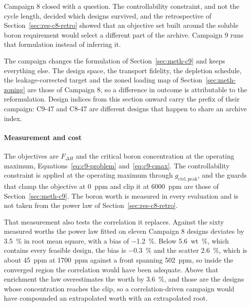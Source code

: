 Campaign 8 closed with a question. The controllability constraint, and
not the cycle length, decided which designs survived, and the
retrospective of Section~\ref{sec:res-c8-retro} showed that an objective
set built around the soluble boron requirement would select a different
part of the archive. Campaign 9 runs that formulation instead of
inferring it.

The campaign changes the formulation of Section~\ref{sec:meth-c9} and
keeps everything else. The design space, the transport fidelity, the
depletion schedule, the leakage-corrected target and the zoned loading map
of Section~\ref{sec:meth-zoning} are those of Campaign 8, so a difference
in outcome is attributable to the reformulation. Design indices from this
section onward carry the prefix of their campaign: C9-47 and C8-47 are
different designs that happen to share an archive index.

\paragraph{Measurement and cost}
\label{sec:res-c9-formulation}

The objectives are $F_{\Delta H}$ and the critical boron concentration at
the operating maximum, Equations~\eqref{eq:c9-problem}
and~\eqref{eq:c9-cmax}. The controllability constraint is applied at the operating
maximum through $g_\mathrm{ctrl,peak}$, and the guards that clamp
the objective at \SI{0}{ppm} and clip it at \SI{6000}{ppm} are those of
Section~\ref{sec:meth-c9}. The boron worth is measured in every evaluation
and is not taken from the power law of
Section~\ref{sec:res-c8-retro}.

That measurement also tests the correlation it replaces. Against the
sixty measured worths the power law fitted on eleven Campaign 8 designs
deviates by \SI{3.5}{\%} in root mean square, with a bias of
\SI{-1.2}{\%}. Below \SI{5.6}{wt\%}, which contains every feasible design,
the bias is \SI{-0.3}{\%} and the scatter \SI{2.6}{\%}, which is about
\SI{45}{ppm} at \SI{1700}{ppm} against a front spanning \SI{502}{ppm},
so inside the converged region the correlation would have been
adequate. Above that enrichment the law overestimates the worth by
\SI{3.6}{\%}, and those are the designs whose concentration reaches the
clip, so a correlation-driven campaign would have compounded an
extrapolated worth with an extrapolated root.

